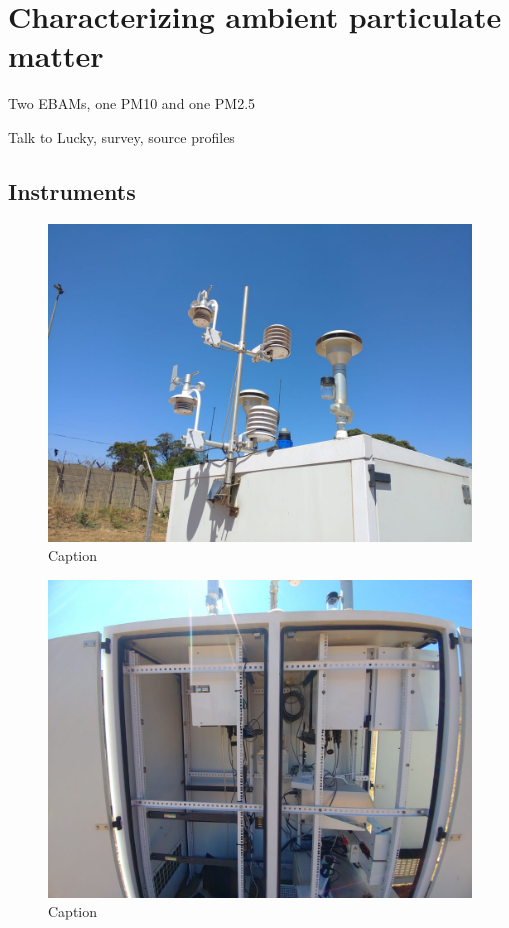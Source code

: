\documentclass{nwureport}
\begin{document}
\section{Characterizing ambient particulate matter}
Two EBAMs, one PM10 and one PM2.5 

Talk to Lucky, survey, source profiles

\subsection{Instruments}


\begin{figure}[!htb]
    \centering
    \includegraphics[width=\textwidth]{images/wedela.jpeg}
    \caption[]{Caption}
    \label{fig:wadela_instruments_met}
\end{figure}

\begin{figure}[!htb]
    \centering
    \includegraphics[width=\textwidth]{images/wadela_10.jpeg}
    \caption[]{Caption}
    \label{fig:wadela_instruments_pm}
\end{figure}
\end{document}
